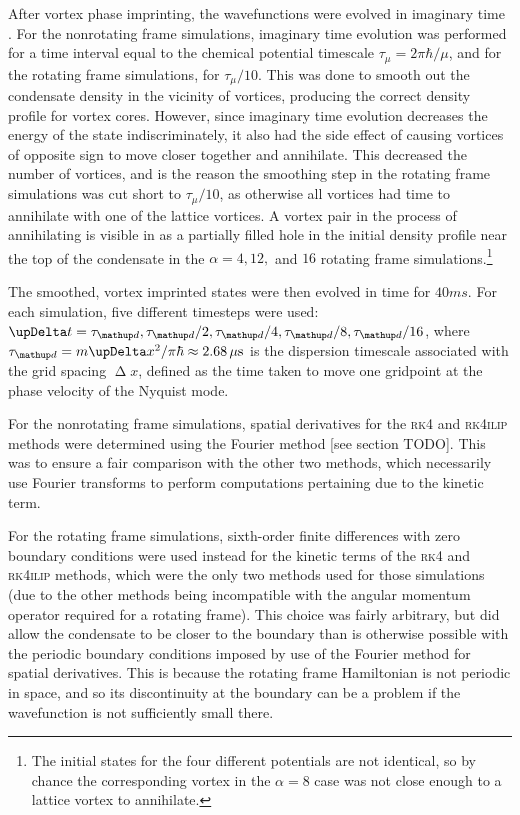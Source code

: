After vortex phase imprinting, the wavefunctions were evolved in imaginary time \cite{chiofalo2000}. For the nonrotating frame simulations, imaginary time evolution was performed for a time interval equal to the chemical potential timescale $\tau_\mu= 2\pi\hbar/\mu$, and for the rotating frame simulations, for $\tau_\mu/10$. This was done to smooth out the condensate density in the vicinity of vortices, producing the correct density profile for vortex cores. However, since imaginary time evolution decreases the energy of the state indiscriminately, it also had the side effect of causing vortices of opposite sign to move closer together and annihilate. This decreased the number of vortices, and is the reason the smoothing step in the rotating frame simulations was cut short to $\tau_\mu/10$, as otherwise all vortices had time to annihilate with one of the lattice vortices. A vortex pair in the process of annihilating is visible in  as a partially filled hole in the initial density profile near the top of the condensate in the $\alpha=4, 12,$ and $16$ rotating frame simulations.\footnote{The initial states for the four different potentials are not identical, so by chance the corresponding vortex in the $\alpha=8$ case was not close enough to a lattice vortex to annihilate.}

The smoothed, vortex imprinted states were then evolved in time for $40\unit{ms}$. For each simulation, five different timesteps were used: $\upDelta t = \tau_\up d, \tau_\up d / 2, \tau_\up d / 4, \tau_\up d / 8, \tau_\up d / 16$, where \mbox{$\tau_\up d = m \upDelta x^2 / \pi\hbar \approx 2.68\unit{\mu s}$} is the dispersion timescale associated with the grid spacing $\upDelta x$, defined as the time taken to move one gridpoint at the phase velocity of the Nyquist mode.

For the nonrotating frame simulations, spatial derivatives for the \textsc{rk4} and \textsc{rk4ilip} methods were determined using the Fourier method [see section TODO]. This was to ensure a fair comparison with the other two methods, which necessarily use Fourier transforms to perform computations pertaining due to the kinetic term.

For the rotating frame simulations, sixth-order finite differences with zero boundary conditions were used instead for the kinetic terms of the \textsc{rk4} and \textsc{rk4ilip} methods, which were the only two methods used for those simulations (due to the other methods being incompatible with the angular momentum operator required for a rotating frame). This choice was fairly arbitrary, but did allow the condensate to be closer to the boundary than is otherwise possible with the periodic boundary conditions imposed by use of the Fourier method for spatial derivatives. This is because the rotating frame Hamiltonian is not periodic in space, and so its discontinuity at the boundary can be a problem if the wavefunction is not sufficiently small there.

